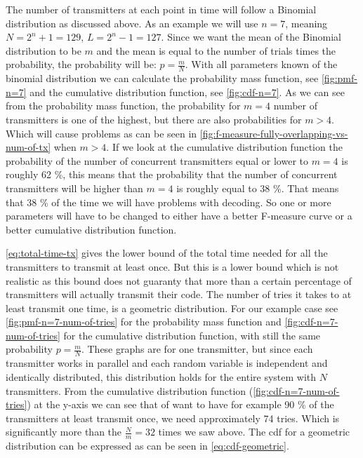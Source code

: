 		The number of transmitters at each point in time will follow a Binomial distribution as discussed above. As an example we will use $n = 7$, meaning $N = 2^n + 1 = 129$, $L = 2^n - 1 = 127$.
		Since we want the mean of the Binomial distribution to be $m$ and the mean is equal to the number of trials times the probability, the probability will be: $p = \frac{m}{N}$.
		With all parameters known of the binomial distribution we can calculate the probability mass function, see \autoref{fig:pmf-n=7} and the cumulative distribution function, see \autoref{fig:cdf-n=7}.
		As we can see from the probability mass function, the probability for $m = 4$ number of transmitters is one of the highest, but there are also probabilities for $m > 4$.
		Which will cause problems as can be seen in \autoref{fig:f-measure-fully-overlapping-vs-num-of-tx} when $m > 4$.
		If we look at the cumulative distribution function the probability of the number of concurrent transmitters equal or lower to $m = 4$ is roughly 62 \%, this means that the probability that the number of concurrent transmitters will be higher than $m = 4$ is roughly equal to 38 \%. 
		That means that 38 \% of the time we will have problems with decoding.
		So one or more parameters will have to be changed to either have a better F-measure curve or a better cumulative distribution function.


		\autoref{eq:total-time-tx} gives the lower bound of the total time needed for all the transmitters to transmit at least once.
		But this is a lower bound which is not realistic as this bound does not guaranty that more than a certain percentage of transmitters will actually transmit their code.
		The number of tries it takes to at least transmit one time, is a geometric distribution.
		For our example case see \autoref{fig:pmf-n=7-num-of-tries} for the probability mass function and \autoref{fig:cdf-n=7-num-of-tries} for the cumulative distribution function, with still the same probability $p = \frac{m}{N}$.
		These graphs are for one transmitter, but since each transmitter works in parallel and each random variable is independent and identically distributed, this distribution holds for the entire system with $N$ transmitters.
		From the cumulative distribution function (\autoref{fig:cdf-n=7-num-of-tries}) at the y-axis we can see that of want to have for example 90 \% of the transmitters at least transmit once, we need approximately 74 tries. 
		Which is significantly more than the $\frac{N}{m} = 32$ times we saw above.
		The cdf for a geometric distribution can be expressed as can be seen in \autoref{eq:cdf-geometric}.


